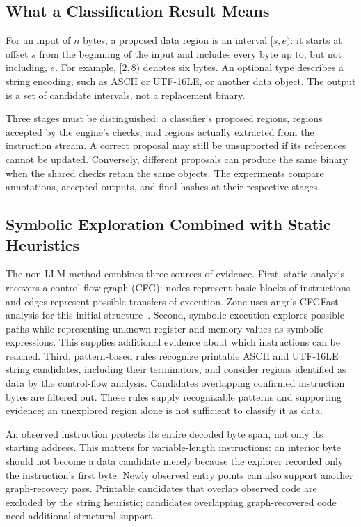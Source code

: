 \subsection{What a Classification Result Means}
For an input of $n$ bytes, a proposed data region is an interval $[s,e)$:
it starts at offset $s$ from the beginning of the input and includes every
byte up to, but not including, $e$. For example, $[2,8)$ denotes six bytes.
An optional type describes a string encoding, such as ASCII or UTF-16LE,
or another data object. The output is a set of candidate intervals,
not a replacement binary.

Three stages must be distinguished: a classifier's proposed regions,
regions accepted by the engine's checks, and regions actually extracted
from the instruction stream. A correct proposal may still be unsupported
if its references cannot be updated. Conversely, different proposals can
produce the same binary when the shared checks retain the same objects.
The experiments compare annotations, accepted outputs, and final hashes
at their respective stages.

\subsection{Symbolic Exploration Combined with Static Heuristics}
The non-LLM method combines three sources of evidence. First, static
analysis recovers a control-flow graph (CFG): nodes represent basic blocks
of instructions and edges represent possible transfers of execution.
Zone uses angr's CFGFast analysis for this initial structure~\cite{angr_cfg_docs}.
Second, symbolic execution explores possible paths while representing
unknown register and memory values as symbolic expressions. This supplies
additional evidence about which instructions can be reached. Third,
pattern-based rules recognize printable ASCII and UTF-16LE string
candidates, including their terminators, and consider regions identified
as data by the control-flow analysis. Candidates overlapping confirmed
instruction bytes are filtered out. These rules supply recognizable
patterns and supporting evidence; an unexplored region alone is not
sufficient to classify it as data.

An observed instruction protects its entire decoded byte span, not only
its starting address. This matters for variable-length instructions: an
interior byte should not become a data candidate merely because the
explorer recorded only the instruction's first byte. Newly observed entry
points can also support another graph-recovery pass. Printable candidates
that overlap observed code are excluded by the string heuristic; candidates
overlapping graph-recovered code need additional structural support.


